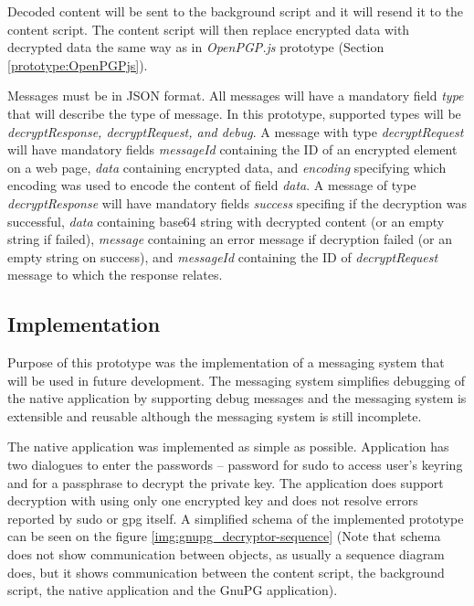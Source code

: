 Decoded content will be sent to the background script and it will resend it to the content script. The content script will then replace encrypted data with decrypted data the same way as in \textit{OpenPGP.js} prototype (Section \ref{prototype:OpenPGPjs}).

Messages must be in JSON format. All messages will have a mandatory field \textit{type} that will describe the type of message. In this prototype, supported types will be \textit{decryptResponse, decryptRequest, and debug}. A message with type \textit{decryptRequest} will have mandatory fields \textit{messageId} containing the ID of an encrypted element on a web page, \textit{data} containing encrypted data, and \textit{encoding} specifying which encoding was used to encode the content of field \textit{data}. A message of type \textit{decryptResponse} will have mandatory fields \textit{success} specifing if the decryption was successful, \textit{data} containing base64 string with decrypted content (or an empty string if failed), \textit{message} containing an error message if decryption failed (or an empty string on success), and \textit{messageId} containing the ID of \textit{decryptRequest} message to which the response relates.

\subsection{Implementation}
Purpose of this prototype was the implementation of a messaging system that will be used in future development. The messaging system simplifies debugging of the native application by supporting debug messages and the messaging system is extensible and reusable although the messaging system is still incomplete.

The native application was implemented as simple as possible. Application has two dialogues to enter the passwords -- password for sudo to access user's keyring and for a passphrase to decrypt the private key. The application does support decryption with using only one encrypted key and does not resolve errors reported by sudo or gpg itself. A simplified schema of the implemented prototype can be seen on the figure \ref{img:gnupg_decryptor-sequence} (Note that schema does not show communication between objects, as usually a sequence diagram does, but it shows communication between the content script, the background script, the native application and the GnuPG application).

